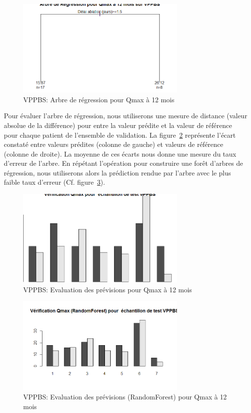\begin{figure}[H]
\centering
\includegraphics[width=0.75\textwidth]{../Fig/VPPBS/vppbs-regtree-qmax12.png}
\caption{VPPBS: Arbre de régression pour Qmax à 12 mois}
\label{fig-vppbs-regtree-qmax12}
\end{figure}

Pour évaluer l'arbre de régression, nous utiliserons une mesure de distance (valeur absolue de la différence) pour entre la valeur prédite et la valeur de référence pour chaque patient de l'ensemble de validation. 
La figure~\ref{fig-vppbs-regtree-test-qmax12} représente l'écart constaté entre valeurs prédites (colonne de gauche) et valeurs de référence (colonne de droite). La moyenne de ces écarts nous donne une mesure du taux d'erreur de l'arbre. En répétant l'opération pour construire une forêt d'arbres de régression, nous utiliserons alors la prédiction rendue par l'arbre avec le plus faible taux d'erreur (Cf. figure~\ref{fig-vppbs-forest-test-qmax12}).

\begin{figure}[H]
\centering
\includegraphics[width=0.75\textwidth]{../Fig/VPPBS/vppbs-regtree-test-qmax12.png}
\caption{VPPBS: Evaluation des prévisions pour Qmax à 12 mois}
\label{fig-vppbs-regtree-test-qmax12}
\end{figure}

\begin{figure}[H]
\centering
\includegraphics[width=0.75\textwidth]{../Fig/VPPBS/vppbs-forest-test-qmax12.png}
\caption{VPPBS: Evaluation des prévisions (RandomForest) pour Qmax à 12 mois}
\label{fig-vppbs-forest-test-qmax12}
\end{figure}
